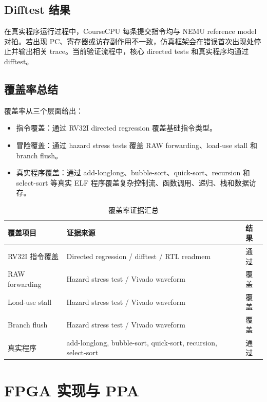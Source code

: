 \documentclass[UTF8,a4paper,12pt]{ctexrep}
\begin{document}
\section{Difftest 结果}

在真实程序运行过程中，CourseCPU 每条提交指令均与 NEMU reference model 对拍。若出现 PC、寄存器或访存副作用不一致，仿真框架会在错误首次出现处停止并输出相关 trace。当前验证流程中，核心 directed tests 和真实程序均通过 difftest。

\section{覆盖率总结}

覆盖率从三个层面给出：

\begin{itemize}
  \item 指令覆盖：通过 RV32I directed regression 覆盖基础指令类型。
  \item 冒险覆盖：通过 hazard stress tests 覆盖 RAW forwarding、load-use stall 和 branch flush。
  \item 真实程序覆盖：通过 add-longlong、bubble-sort、quick-sort、recursion 和 select-sort 等真实 ELF 程序覆盖复杂控制流、函数调用、递归、栈和数据访存。
\end{itemize}

\begin{table}[htbp]
  \centering
  \caption{覆盖率证据汇总}
  \begin{tabularx}{\textwidth}{lXX}
    \toprule
    覆盖项目 & 证据来源 & 结果 \\
    \midrule
    RV32I 指令覆盖 & Directed regression / difftest / RTL readmem & 通过 \\
    RAW forwarding & Hazard stress test / Vivado waveform & 覆盖 \\
    Load-use stall & Hazard stress test / Vivado waveform & 覆盖 \\
    Branch flush & Hazard stress test / Vivado waveform & 覆盖 \\
    真实程序 & add-longlong, bubble-sort, quick-sort, recursion, select-sort & 通过 \\
    \bottomrule
  \end{tabularx}
\end{table}

\chapter{FPGA 实现与 PPA}
\end{document}
